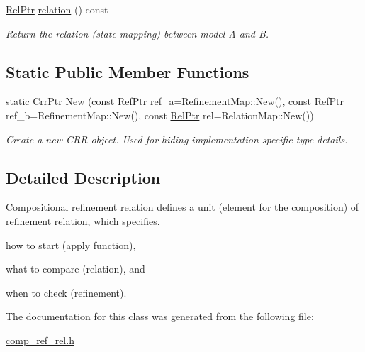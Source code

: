 \begin{DoxyCompactItemize}
\mbox{\label{classilang_1_1_comp_ref_rel_a0cadd43385d0ce35c3744aeb996c9782}} 
\mbox{\hyperlink{namespaceilang_adca57fadf3c1f00dba124eb1ec56e6e9}{Rel\+Ptr}} \mbox{\hyperlink{classilang_1_1_comp_ref_rel_a0cadd43385d0ce35c3744aeb996c9782}{relation}} () const
\begin{DoxyCompactList}\small\item\em Return the relation (state mapping) between model A and B. \end{DoxyCompactList}\end{DoxyCompactItemize}
\subsection*{Static Public Member Functions}
\begin{DoxyCompactItemize}
\item 
\mbox{\label{classilang_1_1_comp_ref_rel_aee61db3b71cd966a03fd38f57b7a2f2a}} 
static \mbox{\hyperlink{classilang_1_1_comp_ref_rel_a9081b437a14b3a2edef9d30b000ea535}{Crr\+Ptr}} \mbox{\hyperlink{classilang_1_1_comp_ref_rel_aee61db3b71cd966a03fd38f57b7a2f2a}{New}} (const \mbox{\hyperlink{namespaceilang_a540a114dcaa252083440129309151528}{Ref\+Ptr}} ref\+\_\+a=Refinement\+Map\+::\+New(), const \mbox{\hyperlink{namespaceilang_a540a114dcaa252083440129309151528}{Ref\+Ptr}} ref\+\_\+b=Refinement\+Map\+::\+New(), const \mbox{\hyperlink{namespaceilang_adca57fadf3c1f00dba124eb1ec56e6e9}{Rel\+Ptr}} rel=Relation\+Map\+::\+New())
\begin{DoxyCompactList}\small\item\em Create a new C\+RR object. Used for hiding implementation specific type details. \end{DoxyCompactList}\end{DoxyCompactItemize}


\subsection{Detailed Description}
Compositional refinement relation defines a unit (element for the composition) of refinement relation, which specifies. 


\begin{DoxyItemize}
\item how to start (apply function),
\item what to compare (relation), and
\item when to check (refinement). 
\end{DoxyItemize}

The documentation for this class was generated from the following file\+:\begin{DoxyCompactItemize}
\item 
\mbox{\hyperlink{comp__ref__rel_8h}{comp\+\_\+ref\+\_\+rel.\+h}}\end{DoxyCompactItemize}

